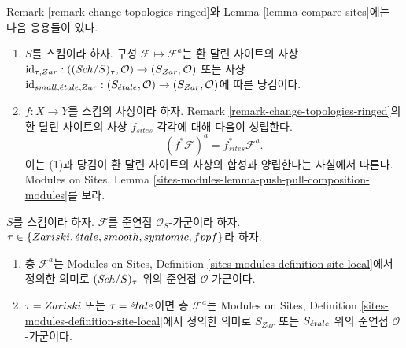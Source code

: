 \begin{remark}
\label{remark-change-topologies-ringed-sites}
Remark \ref{remark-change-topologies-ringed}와
Lemma \ref{lemma-compare-sites}에는 다음 응용들이 있다.
\begin{enumerate}
\item $S$를 스킴이라 하자. 구성 $\mathcal{F} \mapsto \mathcal{F}^a$는
환 달린 사이트의 사상
$\text{id}_{\tau, Zar} : ((\mathit{Sch}/S)_\tau, \mathcal{O})
\to (S_{Zar}, \mathcal{O})$
또는 사상
$\text{id}_{small, {\acute{e}tale}, Zar} :
(S_{\acute{e}tale}, \mathcal{O}) \to (S_{Zar}, \mathcal{O})$에 따른 당김이다.
\item $f : X \to Y$를 스킴의 사상이라 하자. Remark
\ref{remark-change-topologies-ringed}의 환 달린 사이트의 사상
$f_{sites}$ 각각에 대해 다음이 성립한다.
$$
(f^*\mathcal{F})^a = f_{sites}^*\mathcal{F}^a.
$$
이는 (1)과 당김이 환 달린 사이트의 사상의 합성과 양립한다는 사실에서
따른다. Modules on Sites, Lemma
\ref{sites-modules-lemma-push-pull-composition-modules}를 보라.
\end{enumerate}
\end{remark}

\begin{lemma}
\label{lemma-quasi-coherent-gives-quasi-coherent}
$S$를 스킴이라 하자.
$\mathcal{F}$를 준연접 $\mathcal{O}_S$-가군이라 하자.
$\tau \in \{Zariski, \linebreak[0] \etale, \linebreak[0]
smooth, \linebreak[0] syntomic, \linebreak[0] fppf\}$라 하자.
\begin{enumerate}
\item 층 $\mathcal{F}^a$는 Modules on Sites, Definition
\ref{sites-modules-definition-site-local}에서 정의한 의미로
$(\mathit{Sch}/S)_\tau$ 위의 준연접 $\mathcal{O}$-가군이다.
\item $\tau = Zariski$ 또는 $\tau = {\acute{e}tale}$이면 층 $\mathcal{F}^a$는
Modules on Sites, Definition \ref{sites-modules-definition-site-local}에서
정의한 의미로 $S_{Zar}$ 또는 $S_{\acute{e}tale}$ 위의 준연접
$\mathcal{O}$-가군이다.
\end{enumerate}
\end{lemma}

